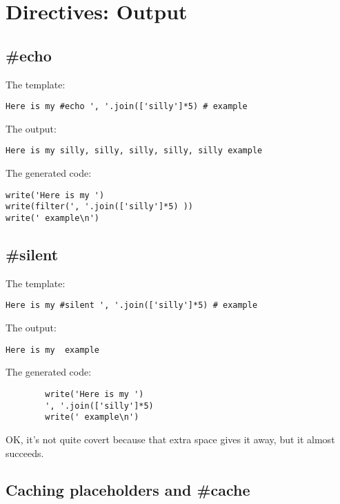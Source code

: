 \section{Directives: Output}
\label{output}

\subsection{\#echo}
\label{output.echo}

The template:
\begin{verbatim}
Here is my #echo ', '.join(['silly']*5) # example
\end{verbatim}

The output:
\begin{verbatim}
Here is my silly, silly, silly, silly, silly example
\end{verbatim}

The generated code:
\begin{verbatim}
write('Here is my ')
write(filter(', '.join(['silly']*5) ))
write(' example\n')
\end{verbatim}

\subsection{\#silent}
\label{output.silent}

The template:
\begin{verbatim}
Here is my #silent ', '.join(['silly']*5) # example
\end{verbatim}

The output:
\begin{verbatim}
Here is my  example
\end{verbatim}

The generated code:
\begin{verbatim}
        write('Here is my ')
        ', '.join(['silly']*5) 
        write(' example\n')
\end{verbatim}

OK, it's not quite covert because that extra space gives it away, but it 
almost succeeds.

\subsection{Caching placeholders and \#cache}
\label{output.cache}


